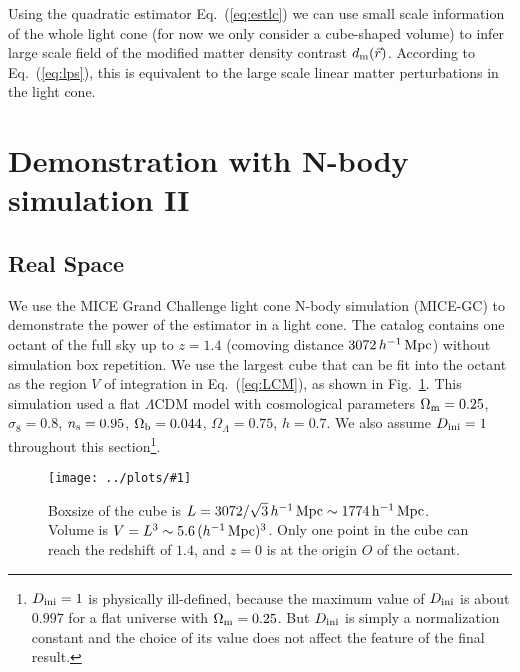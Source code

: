 \documentclass[prd,amsmath,amssymb,floatfix,superscriptaddress,nofootinbib,twocolumn]{revtex4-1}
\newcommand{\ini}{\rm ini}
\newcommand{\vrr}{\vec{r}}
\newcommand{\vk}{\vec{k}}
\newcommand{\ec}[1]{Eq.~(\ref{eq:#1})}
\newcommand{\rf}[1]{\ref{fig:#1}}
\newcommand{\sfig}[2]{
\texttt{[image: ../plots/\#1]}
        }
\newcommand{\Sfig}[2]{
   \begin{figure}[thbp]
   \begin{center}
    \sfig{../plots/#1.pdf}{\columnwidth}
    \caption{{\small #2}}
    \label{fig:#1}
     \end{center}
   \end{figure}
}
\begin{document}
Using the quadratic estimator \ec{estlc} we can use small scale information of the whole light cone (for now we only consider a cube-shaped volume) to infer large scale field of the modified matter density contrast $d_{\rm m}(\vrr)$. According to \ec{lps}, this is equivalent to the large scale linear matter perturbations in the light cone.

\section{Demonstration with N-body simulation II} \label{sec6}
\subsection{Real Space}
\noindent We use the MICE Grand Challenge light cone N-body simulation (MICE-GC) to demonstrate the power of the estimator in a light cone. The catalog contains one octant of the full sky up to $z = 1.4$ (comoving distance $3072\, h^{-1}\, \rm Mpc$) without simulation box repetition. We use the largest cube that can be fit into the octant as the region $V$ of integration in \ec{LCM}, as shown in Fig.~\rf{Cube}. This simulation used a flat $\Lambda$CDM model with cosmological parameters $ \Omega_{\rm m}=0.25$, $\sigma_8 = 0.8$, $n_{\rm s}=0.95$, $\Omega_{\rm b}=0.044$, $\Omega_{\Lambda}=0.75$, $h=0.7$. We also assume $D_{\ini}=1$ throughout this section\footnote{$D_{\rm ini}=1$ is physically ill-defined, because the maximum value of $D_{\rm ini}$ is about $0.997$ for a flat universe with $\Omega_{\rm m}=0.25$. But $D_{\rm ini}$ is simply a normalization constant and the choice of its value does not affect the feature of the final result.}. 

\Sfig{Cube}{Boxsize of the cube is $L=3072/\sqrt{3}\, h^{-1}\, \rm Mpc\sim 1774\, h^{-1}\, \rm Mpc$. Volume is $V=L^3\sim 5.6\,(h^{-1}\,\rm Mpc)^3$. Only one point in the cube can reach the redshift of $1.4$, and $z=0$ is at the origin $O$ of the octant.}
\end{document}
